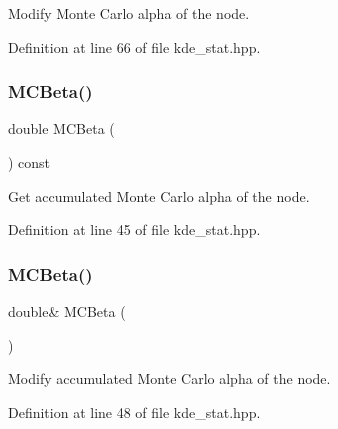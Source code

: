 Modify Monte Carlo alpha of the node. 



Definition at line 66 of file kde\+\_\+stat.\+hpp.

\mbox{\label{classmlpack_1_1kde_1_1KDEStat_ac96f65761044e25d12633a47c17bda0e}} 
\subsubsection{M\+C\+Beta()\hspace{0.1cm}{\footnotesize\ttfamily [1/2]}}
{\footnotesize\ttfamily double M\+C\+Beta (\begin{DoxyParamCaption}{ }\end{DoxyParamCaption}) const\hspace{0.3cm}{\ttfamily [inline]}}



Get accumulated Monte Carlo alpha of the node. 



Definition at line 45 of file kde\+\_\+stat.\+hpp.

\mbox{\label{classmlpack_1_1kde_1_1KDEStat_a87e9dbd91538272fd963fb4dc9acf345}} 
\subsubsection{M\+C\+Beta()\hspace{0.1cm}{\footnotesize\ttfamily [2/2]}}
{\footnotesize\ttfamily double\& M\+C\+Beta (\begin{DoxyParamCaption}{ }\end{DoxyParamCaption})\hspace{0.3cm}{\ttfamily [inline]}}



Modify accumulated Monte Carlo alpha of the node. 



Definition at line 48 of file kde\+\_\+stat.\+hpp.

\mbox{\label{classmlpack_1_1kde_1_1KDEStat_a65cba07328997659bec80b9879b15a51}} 
